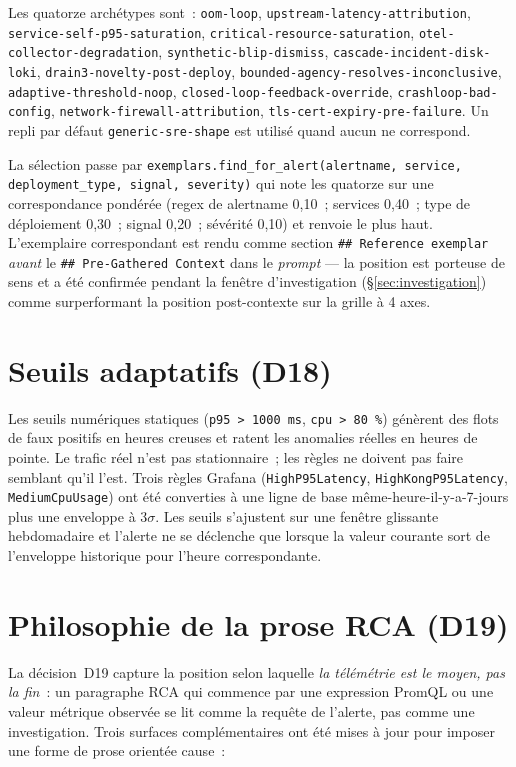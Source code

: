 \documentclass[11pt,a4paper,oneside]{report}
\begin{document}
Les quatorze archétypes sont~: \texttt{oom-loop},
\texttt{upstream-latency-attribution},
\texttt{service-self-p95-saturation},
\texttt{critical-resource-saturation},
\texttt{otel-collector-degradation},
\texttt{synthetic-blip-dismiss},
\texttt{cascade-incident-disk-loki},
\texttt{drain3-novelty-post-deploy},
\texttt{bounded-agency-resolves-inconclusive},
\texttt{adaptive-threshold-noop},
\texttt{closed-loop-feedback-override},
\texttt{crashloop-bad-config},
\texttt{network-firewall-attribution},
\texttt{tls-cert-expiry-pre-failure}. Un repli par défaut
\texttt{generic-sre-shape} est utilisé quand aucun ne correspond.

La sélection passe par
\texttt{exemplars.find\_for\_alert(alertname, service, deployment\_type,
signal, severity)} qui note les quatorze sur une correspondance
pondérée (regex de alertname 0,10~; services 0,40~; type de
déploiement 0,30~; signal 0,20~; sévérité 0,10) et renvoie le plus
haut. L'exemplaire correspondant est rendu comme section
\texttt{\#\# Reference exemplar} \emph{avant} le
\texttt{\#\# Pre-Gathered Context} dans le \emph{prompt} --- la
position est porteuse de sens et a été confirmée pendant la
fenêtre d'investigation (\S\ref{sec:investigation}) comme
surperformant la position post-contexte sur la grille à 4 axes.

\section{Seuils adaptatifs (D18)}

Les seuils numériques statiques (\texttt{p95 > 1000\,ms},
\texttt{cpu > 80\,\%}) génèrent des flots de faux positifs en heures
creuses et ratent les anomalies réelles en heures de pointe. Le
trafic réel n'est pas stationnaire~; les règles ne doivent pas
faire semblant qu'il l'est. Trois règles Grafana
(\texttt{HighP95Latency}, \texttt{HighKongP95Latency},
\texttt{MediumCpuUsage}) ont été converties à une ligne de base
même-heure-il-y-a-7-jours plus une enveloppe à $3\sigma$. Les seuils
s'ajustent sur une fenêtre glissante hebdomadaire et l'alerte ne se
déclenche que lorsque la valeur courante sort de l'enveloppe
historique pour l'heure correspondante.

\section{Philosophie de la prose RCA (D19)}

La décision~D19 capture la position selon laquelle \emph{la
télémétrie est le moyen, pas la fin}~: un paragraphe RCA qui
commence par une expression PromQL ou une valeur métrique observée
se lit comme la requête de l'alerte, pas comme une investigation.
Trois surfaces complémentaires ont été mises à jour pour imposer
une forme de prose orientée cause~:
\end{document}

